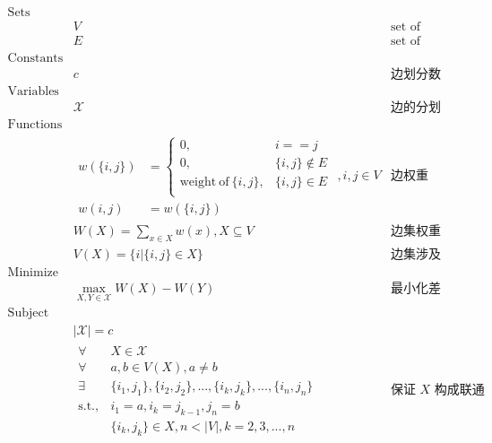 \documentclass[11pt]{article}
\begin{document}
\begin{eqnarray*}
    \textrm{Sets} \\
        & V & \textrm{set of vertices} \\
        & E & \textrm{set of edges} \\
    \textrm{Constants} \\
        & c & \textrm{边划分数量} \\
    \textrm{Variables} \\
        & \mathcal{X} & \textrm{边的分划} \\
    \textrm{Functions} \\
        & \begin{array}{rl}
            w(\{i, j\}) &= \left\{
                \begin{array}{ll}
                    0, & i == j \\
                    0, & \{i, j\} \notin E \\
                    \mathrm{weight\ of\ }\{i, j\}, & \{i, j\} \in E \\
                \end{array}
            \right. \\
            w(i, j) &= w(\{i, j\})
        \end{array}, i, j \in V & \textrm{边权重} \\
        & \displaystyle W(X) = \sum_{x \in X} w(x) , X \subseteq V & \textrm{边集权重} \\
        & V(X) = \{i | \{i, j\} \in X\} & \textrm{边集涉及的点集} \\
    \textrm{Minimize} \\
        & \displaystyle \max_{X, Y \in \mathcal{X}} W(X) - W(Y) & \textrm{最小化差距} \\
    \textrm{Subject to} \\
        & |\mathcal{X}| = c & \\
        & \begin{array}{rl}
            \forall & X \in \mathcal{X} \\
            \forall & a, b \in V(X), a \neq b \\
            \exists & \{i_1, j_1\}, \{i_2, j_2\}, ..., \{i_k, j_k\}, ..., \{i_n, j_n\} \\
            \mathrm{s.t.,} & i_1 = a, i_k = j_{k-1}, j_n = b \\
                    & \{i_k, j_k\} \in X, n < |V|, k = 2, 3, ..., n
        \end{array} & \textrm{保证 $X$ 构成联通图} \\ 
\end{eqnarray*}
\end{document}
